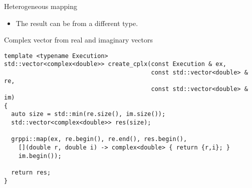\begin{frame}[t,fragile]{Heterogeneous mapping}
\begin{itemize}
  \item The result can be from a different type.
\end{itemize}
\begin{block}{Complex vector from real and imaginary vectors}
\begin{lstlisting}
template <typename Execution>
std::vector<complex<double>> create_cplx(const Execution & ex,
                                         const std::vector<double> & re,
                                         const std::vector<double> & im)
{
  auto size = std::min(re.size(), im.size());
  std::vector<complex<double>> res(size);

  grppi::map(ex, re.begin(), re.end(), res.begin(),
    [](double r, double i) -> complex<double> { return {r,i}; }
    im.begin());

  return res;
}
\end{lstlisting}
\end{block}
\end{frame}
